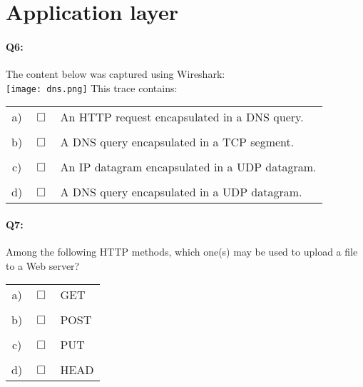 \documentclass{llncs}
\newcommand{\answer}[1]{}%
\begin{document}
\answer{
  $P=\sum_{i=6}^{15}{\binom {15}i 0.2^{i}0.8^{(15-i)}}$. See slide 30 in Chapter 1.
}

\section*{Application layer}

\paragraph{\textbf{Q6:}}
The content below was captured using
Wireshark:\\
\texttt{[image: dns.png]}
This trace contains:\\

\begin{tabular}{ccl}
  a) & $\Box$ & An HTTP request encapsulated in a DNS query.\\
  \\
  b) & $\Box$ & A DNS query encapsulated in a TCP segment.\\
  \\
  c) & $\Box$ & An IP datagram encapsulated in a UDP datagram.\\
  \\
  d) & $\Box$ & A DNS query encapsulated in a UDP datagram.
\end{tabular}

\answer{Wireshark traces are read from bottom to top. DNS (Domain Name
  System) is an application-level protocol therefore it has to use a
  transport-level protocol which happens to be UDP (User Datagram
  Protocol) here. IP datagrams could never be encapsulated in UDP datagrams
  since IP belongs to a lower layer than UDP. HTTP requests could
  never be encapsulated in DNS queries since both protocols are
  application-level.}

\paragraph{\textbf{Q7:}} Among the following HTTP methods, which one(s) may be used to upload a file to a
Web server?\\

\begin{tabular}{ccl}
  a) & $\Box$ & GET\\
  \\
  b) & $\Box$ & POST\\
  \\
  c) & $\Box$ & PUT\\
  \\
  d) & $\Box$ & HEAD\\
\end{tabular}
\end{document}
